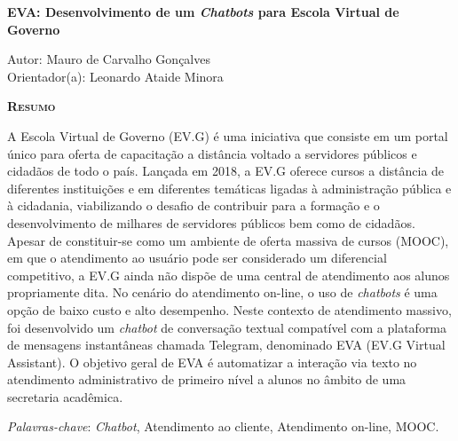 \begin{center}
	{\Large{\textbf{EVA: Desenvolvimento de um \textit{Chatbots} para Escola Virtual de Governo}}}
\end{center}

\vspace{1cm}

\begin{flushright}
	Autor: Mauro de Carvalho Gonçalves\\
	Orientador(a): Leonardo Ataide Minora
\end{flushright}

\vspace{1cm}

\begin{center}
	\Large{\textsc{\textbf{Resumo}}}
\end{center}

\noindent A Escola Virtual de Governo (EV.G) é uma iniciativa que consiste em um portal único para oferta de capacitação a distância voltado a servidores públicos e cidadãos de todo o país.
Lançada em 2018, a EV.G oferece cursos a distância de diferentes instituições e em diferentes temáticas ligadas à administração pública e à cidadania, viabilizando o desafio de contribuir para a formação e o desenvolvimento de milhares de servidores públicos bem como de cidadãos.
Apesar de constituir-se como um ambiente de oferta massiva de cursos (MOOC), em que o atendimento ao usuário pode ser considerado um diferencial competitivo, a EV.G ainda não dispõe de uma central de atendimento aos alunos propriamente dita.
No cenário do atendimento on-line, o uso de \textit{chatbots} é uma opção de baixo custo e alto desempenho. 
Neste contexto de atendimento massivo, foi desenvolvido um \textit{chatbot} de conversação textual compatível com a plataforma de mensagens instantâneas chamada Telegram, denominado EVA (EV.G Virtual Assistant). O objetivo geral de EVA é automatizar a interação via texto no atendimento administrativo de primeiro nível a alunos no âmbito de uma secretaria acadêmica.


\noindent\textit{Palavras-chave}: \textit{Chatbot}, Atendimento ao cliente, Atendimento on-line, MOOC.